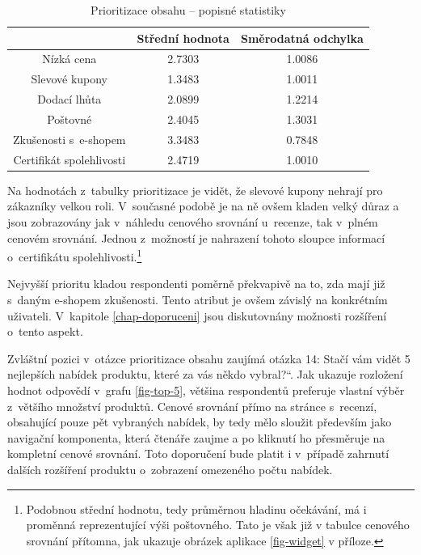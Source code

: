 \documentclass[12pt,twoside,openany]{fithesis}
\begin{document}
      \begin{table}[htb]
          \begin{center}%
              \begin{tabular}{|c|c|c|}
                  \hline 
                  {{}} & {{Střední hodnota}} & {{Směrodatná odchylka}} 
\tabularnewline
                   \hline 
                   {{Nízká cena}} & {{2.7303}} & {{1.0086}} \tabularnewline
                    \hline 
                    {{Slevové kupony}} & {{1.3483}} & {{1.0011}} 
\tabularnewline
                     \hline 
                     {{Dodací lhůta}} & {{2.0899}} & {{1.2214}} 
\tabularnewline
                      \hline 
                      {{Poštovné}} & {{2.4045}} & {{1.3031}} \tabularnewline
                       \hline 
                       {{Zkušenosti s~e-shopem}} & {{3.3483}} & {{0.7848}} 
\tabularnewline
                        \hline 
                        {{Certifikát spolehlivosti}} & {{2.4719}} & {{1.0010}} 
\tabularnewline
                        \hline 
                    \end{tabular}
                    \caption{Prioritizace obsahu -- popisné statistiky}\label{tab-prioritizace}
                \end{center}
            \end{table}

            Na hodnotách z~tabulky prioritizace je vidět, že slevové kupony 
nehrají pro zákazníky velkou roli. V~současné podobě je na ně ovšem 
kladen velký důraz a jsou zobrazovány jak v~náhledu cenového srovnání 
u~recenze, tak v~plném cenovém srovnání. Jednou z~možností je nahrazení 
tohoto sloupce informací o~certifikátu spolehlivosti.\footnote{
    Podobnou střední hodnotu, tedy průměrnou hladinu očekávání, má i proměnná
    reprezentující výši poštovného. Tato je však již v tabulce cenového
    srovnání přítomna, jak ukazuje obrázek aplikace \hyperlink{fig-widget}{{\ref{fig-widget}}} v příloze.
}

            Nejvyšší prioritu kladou respondenti poměrně překvapivě na 
to, zda mají již s~daným e-shopem zkušenosti. Tento atribut je ovšem 
závislý na konkrétním uživateli. V~kapitole 
\hyperlink{chap-doporuceni}{{\ref{chap-doporuceni}}} jsou diskutovnány 
možnosti rozšíření o~tento aspekt.

            Zvláštní pozici v~otázce prioritizace obsahu zaujímá otázka 
14: \glqq Stačí vám vidět 5 nejlepších nabídek produktu, které za vás 
někdo vybral?\textquotedblleft{}. Jak ukazuje rozložení hodnot odpovědí 
v~grafu \hyperlink{fig-top-5}{{\ref{fig-top-5}}}, většina respondentů 
preferuje vlastní výběr z~většího množství produktů. Cenové 
srovnání přímo na stránce s~recenzí, obsahující pouze pět vybraných 
nabídek, by tedy mělo sloužit především jako navigační komponenta, 
která čtenáře zaujme a po kliknutí ho přesměruje na kompletní cenové 
srovnání. Toto doporučení bude platit i v~případě zahrnutí dalších 
rozšíření produktu o~zobrazení omezeného počtu nabídek.
\end{document}
